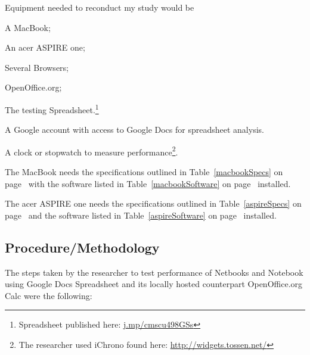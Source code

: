 Equipment needed to reconduct my study would be
\begin{inparaenum}[(1)]
\item A MacBook;
\item An acer ASPIRE one;
\item Several Browsers;
\item OpenOffice.org;
\item The testing Spreadsheet.\footnote{Spreadsheet published here:
  \url{j.mp/cmscu498GSs}}
\item A Google account with access to Google Docs for spreadsheet analysis.
\item A clock or stopwatch to measure performance\footnote{The researcher used
  iChrono found here: \url{http://widgets.tossen.net/}}.
\end{inparaenum}

The MacBook needs the specifications outlined in Table~\ref{macbookSpecs} on
page~\pageref{macbookSpecs} with the software listed in
Table~\ref{macbookSoftware} on page~\pageref{macbookSoftware} installed.

The acer ASPIRE one needs the specifications outlined in Table~\ref{aspireSpecs}
on page~\pageref{aspireSpecs} and the software listed in
Table~\ref{aspireSoftware} on page~\pageref{aspireSoftware} installed.









\subsection{Procedure/Methodology}


The steps taken by the researcher to test performance of Netbooks and Notebook
using Google Docs Spreadsheet and its locally hosted counterpart OpenOffice.org
Calc were the following:

